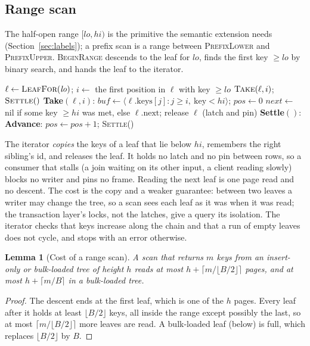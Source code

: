 \documentclass[sigconf, nonacm]{acmart}
\newtheorem{lemma}{Lemma}
\begin{document}
\subsection{Range scan}

The half-open range $[\mathit{lo},\mathit{hi})$ is the primitive the semantic extension needs (Section~\ref{sec:labels}); a prefix scan is a range between \textsc{PrefixLower} and \textsc{PrefixUpper}. \textsc{BeginRange} descends to the leaf for $\mathit{lo}$, finds the first key $\ge \mathit{lo}$ by binary search, and hands the leaf to the iterator.

\begin{algorithm}[t]
\caption{\textsc{BeginRange}$(\mathit{lo},\mathit{hi})$, \textsc{Take}, and \textsc{Settle}}\label{alg:range}
\small
$\ell \gets \textsc{LeafFor}(\mathit{lo})$; $i \gets$ the first position in $\ell$ with key $\ge \mathit{lo}$\;
$\textsc{Take}(\ell, i)$; $\textsc{Settle}()$\;
\medskip
\textbf{Take}$(\ell, i)$: $\mathit{buf} \gets \langle \ell.\text{keys}[j] : j \ge i,\ \text{key} < \mathit{hi}\rangle$; $\mathit{pos} \gets 0$\;
\quad $\mathit{next} \gets$ nil if some key $\ge \mathit{hi}$ was met, else $\ell.\text{next}$; release $\ell$ (latch and pin)\;
\textbf{Settle}$()$: 
\medskip
\textbf{Advance}: $\mathit{pos} \gets \mathit{pos}+1$; \textsc{Settle}()\;
\end{algorithm}

The iterator \emph{copies} the keys of a leaf that lie below $\mathit{hi}$, remembers the right sibling's id, and releases the leaf. It holds no latch and no pin between rows, so a consumer that stalls (a join waiting on its other input, a client reading slowly) blocks no writer and pins no frame. Reading the next leaf is one page read and no descent. The cost is the copy and a weaker guarantee: between two leaves a writer may change the tree, so a scan sees each leaf as it was when it was read; the transaction layer's locks, not the latches, give a query its isolation. The iterator checks that keys increase along the chain and that a run of empty leaves does not cycle, and stops with an error otherwise.

\begin{lemma}[Cost of a range scan]\label{lem:scan}
A scan that returns $m$ keys from an insert-only or bulk-loaded tree of height $h$ reads at most $h + \lceil m/\lfloor B/2\rfloor\rceil$ pages, and at most $h + \lceil m/B\rceil$ in a bulk-loaded tree.
\end{lemma}
\begin{proof}
The descent ends at the first leaf, which is one of the $h$ pages. Every leaf after it holds at least $\lfloor B/2\rfloor$ keys, all inside the range except possibly the last, so at most $\lceil m/\lfloor B/2\rfloor\rceil$ more leaves are read. A bulk-loaded leaf (below) is full, which replaces $\lfloor B/2\rfloor$ by $B$.
\end{proof}
\end{document}
